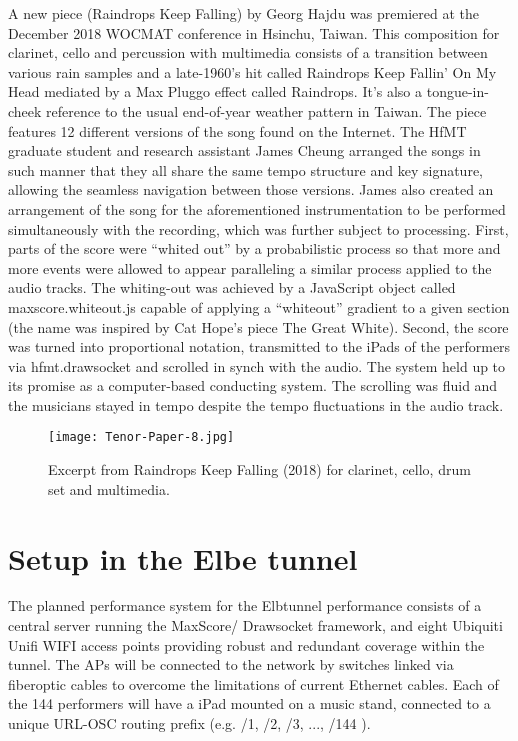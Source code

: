A new  piece (Raindrops Keep Falling) by Georg Hajdu was premiered at the December 2018 WOCMAT conference in Hsinchu, Taiwan. This composition for clarinet, cello and percussion with multimedia consists of a transition between various rain samples and a late-1960’s hit called Raindrops Keep Fallin' On My Head mediated by a Max Pluggo effect called Raindrops. It’s also a tongue-in-cheek reference to the usual end-of-year weather pattern in Taiwan. The piece features 12 different versions of the song found on the Internet. The HfMT graduate student and research assistant James Cheung arranged the songs in such manner that they all share the same tempo structure and key signature, allowing the seamless navigation between those versions. James also created an arrangement of the song for the aforementioned instrumentation to be performed simultaneously with the recording, which was further subject to processing. First, parts of the score were “whited out” by a probabilistic process so that more and more events were allowed to appear paralleling a similar process applied to the audio tracks. The whiting-out was achieved by a JavaScript object called maxscore.whiteout.js capable of applying a “whiteout” gradient to a given section (the name was inspired by Cat Hope’s piece The Great White). Second, the score was turned into proportional notation, transmitted to the iPads of the performers via hfmt.drawsocket and scrolled in synch with the audio. The system held up to its promise as a computer-based conducting system. The scrolling was fluid and the musicians stayed in tempo despite the tempo fluctuations in the audio track. 

\begin{figure*}[h]
    \centering
    \begin{minipage}{0.6\textwidth}
        \centering
        \texttt{[image: Tenor-Paper-8.jpg]} 
       	\caption{Excerpt from Raindrops Keep Falling (2018) for clarinet, cello, drum set and multimedia.
\label{fig:Tenor-Paper-8}}
    \end{minipage}
\end{figure*}



\section{Setup in the Elbe tunnel}
The planned performance system for the Elbtunnel performance consists of a central server running the MaxScore/ Drawsocket framework, and eight Ubiquiti Unifi WIFI access points providing robust and redundant coverage within the tunnel. The APs will be connected to the network by switches linked via fiberoptic cables to overcome the limitations of current Ethernet cables.
Each of the 144 performers will have a iPad mounted on a music stand, connected to a unique URL-OSC routing prefix (e.g. {/1}, {/2}, {/3}, ..., {/144} ). 

